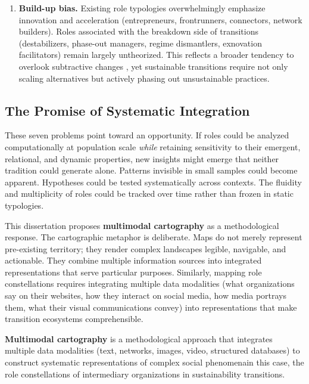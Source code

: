 \documentclass[../main.tex]{subfiles}
\begin{document}
\begin{enumerate}[leftmargin=*, itemsep=0.5em]
\item \textbf{Build-up bias.} Existing role typologies overwhelmingly emphasize innovation and acceleration (entrepreneurs, frontrunners, connectors, network builders). Roles associated with the breakdown side of transitions (destabilizers, phase-out managers, regime dismantlers, exnovation facilitators) remain largely untheorized. This reflects a broader tendency to overlook subtractive changes \parencite{adams2021subtractive}, yet sustainable transitions require not only scaling alternatives but actively phasing out unsustainable practices.

\end{enumerate}

\subsection{The Promise of Systematic Integration}

These seven problems point toward an opportunity. If roles could be analyzed computationally at population scale \emph{while} retaining sensitivity to their emergent, relational, and dynamic properties, new insights might emerge that neither tradition could generate alone. Patterns invisible in small samples could become apparent. Hypotheses could be tested systematically across contexts. The fluidity and multiplicity of roles could be tracked over time rather than frozen in static typologies.

This dissertation proposes \textbf{multimodal cartography} as a methodological response. The cartographic metaphor is deliberate. Maps do not merely represent pre-existing territory; they render complex landscapes legible, navigable, and actionable. They combine multiple information sources into integrated representations that serve particular purposes. Similarly, mapping role constellations requires integrating multiple data modalities (what organizations say on their websites, how they interact on social media, how media portrays them, what their visual communications convey) into representations that make transition ecosystems comprehensible.

\begin{roledef}
\textbf{Multimodal cartography} is a methodological approach that integrates multiple data modalities (text, networks, images, video, structured databases) to construct systematic representations of complex social phenomena\textemdash in this case, the role constellations of intermediary organizations in sustainability transitions.
\end{roledef}
\end{document}
